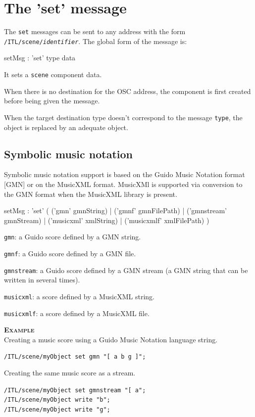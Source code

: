 \documentclass[a4paper,twoside]{report}
\newcommand{\toplevel}[1]	{\chapter{#1}}
\newcommand{\sublevel}[1]	{\section{#1}}
\newcommand{\OSC}[1]		{\texttt{#1}}
\newcommand{\example}		{\textbf{\hspace{-1.5cm}\textbf{\textsc{Example }}}}
\let\olditemize\itemize
\let\oldenditemize\enditemize
\renewenvironment{itemize} 	{\olditemize \setlength{\itemsep}{1mm}}{\oldenditemize}
\newcommand{\sample}	[1]			{\vspace{-2mm}\begin{center}\colorbox{mygrey}{
								\begin{minipage}[t]{0.9\columnwidth} 
								{\small \texttt{#1}}
								\end{minipage}}\end{center}}
\begin{document}
\toplevel{The 'set' message}
\label{setsect}
The \OSC{set} messages can be sent to any address with the form \OSC{/ITL/scene/\textit{identifier}}. The global form of the message is:

\begin{rail}
setMsg : 'set' type data
\end{rail}

It sets a \OSC{scene} component data. 

When there is no destination for the OSC address, the component is first created before being given the message. 

When the target destination type doesn't correspond to the message \OSC{type}, the object is replaced by an adequate object.

\sublevel{Symbolic music notation}
\label{symscore}

Symbolic music notation support is based on the Guido Music Notation format [GMN] or on the MusicXML format. MusicXMl is supported via conversion to the GMN format when the MusicXML library is present.

\begin{rail}
setMsg : 'set' (
	('gmn' gmnString) |
	('gmnf' gmnFilePath) |
	('gmnstream' gmnStream) |
	('musicxml' xmlString) |
	('musicxmlf' xmlFilePath)
)
\end{rail}

\begin{itemize}
\item \OSC{gmn}: a Guido score defined by a GMN string.
\item \OSC{gmnf}: a Guido score defined by a GMN file.
\item \OSC{gmnstream}: a Guido score defined by a GMN stream (a GMN string that can be written in several times).
\item \OSC{musicxml}: a score defined by a MusicXML string.
\item \OSC{musicxmlf}: a score defined by a MusicXML file.
\end{itemize}

\example \\
Creating a music score using a Guido Music Notation language string.
\sample{/ITL/scene/myObject set gmn "[ a b g ]";}
Creating the same music score as a stream.
\sample{/ITL/scene/myObject set gmnstream "[ a";\\
/ITL/scene/myObject write "b";\\
/ITL/scene/myObject write "g";
}
\end{document}

